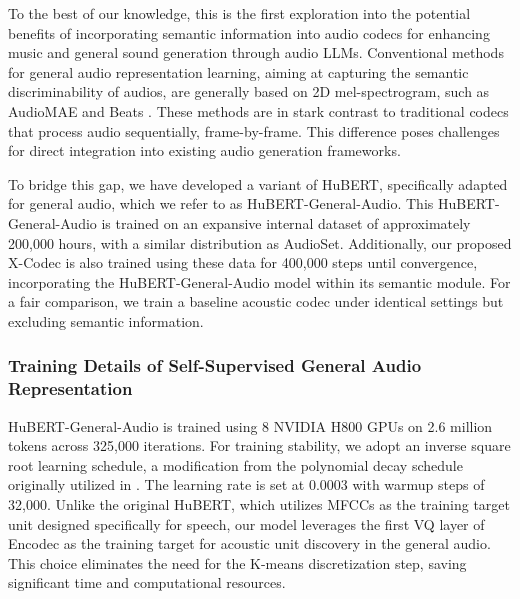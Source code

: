 To the best of our knowledge, this is the first exploration into the potential benefits of incorporating semantic information into audio codecs for enhancing music and general sound generation through audio LLMs. Conventional methods for general audio representation learning, aiming at capturing the semantic discriminability of audios, are generally based on 2D mel-spectrogram, such as AudioMAE \cite{huang2022masked} and Beats \cite{chen2022beats}. These methods are in stark contrast to traditional codecs that process audio sequentially, frame-by-frame. This difference poses challenges for direct integration into existing audio generation frameworks.

To bridge this gap, we have developed a variant of HuBERT, specifically adapted for general audio, which we refer to as HuBERT-General-Audio. This HuBERT-General-Audio is trained on an expansive internal dataset of approximately 200,000 hours, with a similar distribution as AudioSet. Additionally, our proposed X-Codec is also trained using these data for 400,000 steps until convergence, incorporating the HuBERT-General-Audio model within its semantic module. For a fair comparison, we train a baseline acoustic codec under identical settings but excluding semantic information. 

\subsubsection{Training Details of Self-Supervised General Audio Representation}
HuBERT-General-Audio is trained using 8 NVIDIA H800 GPUs on 2.6 million tokens across 325,000 iterations. For training stability, we adopt an inverse square root learning schedule, a modification from the polynomial decay schedule originally utilized in \cite{hsu2021hubert}. The learning rate is set at 0.0003 with warmup steps of 32,000. Unlike the original HuBERT, which utilizes MFCCs as the training target unit designed specifically for speech, our model leverages the first VQ layer of Encodec as the training target for acoustic unit discovery in the general audio. This choice eliminates the need for the K-means discretization step, saving significant time and computational resources.
 
\begin{table}[t!]
\centering
{}
\caption{Comparison between baseline acoustic codec and our X-Codec on music continue.}
\label{music}
\end{table}

